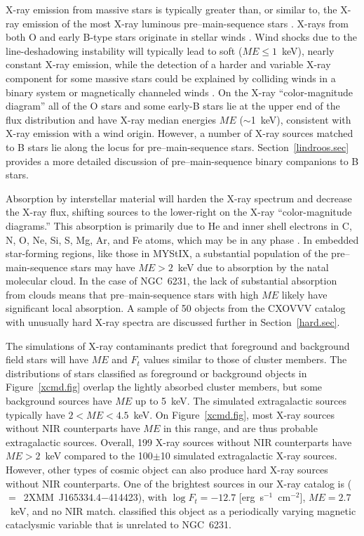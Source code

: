 \documentclass[twocolumn,tighten]{aastex61}
\begin{document}
X-ray emission from massive stars is typically greater than, or similar to, the X-ray emission of the most X-ray luminous pre--main-sequence stars \citep[e.g.,][]{2011ApJS..194....6P}. X-rays from both O and early B-type stars originate in stellar winds \citep{1980ApJ...241..300L,1988ApJ...335..914O,1999ApJ...520..833O,2008MNRAS.386.1855C}. Wind shocks due to the line-deshadowing instability will typically lead to soft ($ME\leq1$~keV), nearly constant X-ray emission, while the detection of a harder and variable X-ray component for some massive stars could be explained by colliding winds in a binary system \citep{2000ApJ...538..808Z} or magnetically channeled winds \citep{1997A&A...323..121B,2005ApJ...628..986G}.  
On the X-ray ``color-magnitude diagram'' all of the O stars and some early-B stars lie at the upper end of the flux distribution and have X-ray median energies $ME$ ($\sim$1~keV), consistent with X-ray emission with a wind origin. However, a number of X-ray sources matched to B stars lie along the locus for pre--main-sequence stars. Section~\ref{lindroos.sec} provides a more detailed discussion of pre--main-sequence binary companions to B stars.  

Absorption by interstellar material will harden the X-ray spectrum and decrease the X-ray flux, shifting sources to the lower-right on the X-ray ``color-magnitude diagrams.'' This absorption is primarily due to He and inner shell electrons in C, N, O, Ne, Si, S, Mg, Ar, and Fe atoms, which may be in any phase \citep{2000ApJ...542..914W}. In embedded star-forming regions, like those in MYStIX, a substantial population of the pre--main-sequence stars may have $ME>2$~keV due to absorption by the natal molecular cloud. In the case of NGC~6231, the lack of substantial absorption from clouds means that pre--main-sequence stars with high $ME$ likely have significant local absorption. 
A sample of 50 objects from the CXOVVV catalog with unusually hard X-ray spectra are discussed further in Section~\ref{hard.sec}.

The simulations of X-ray contaminants predict that foreground and background field stars will have $ME$ and $F_t$ values similar to those of cluster members. The distributions of stars classified as foreground or background objects in Figure~\ref{xcmd.fig} overlap the lightly absorbed cluster members, but some background sources have $ME$ up to 5~keV. The simulated extragalactic sources typically have $2<ME<4.5$~keV. On Figure~\ref{xcmd.fig}, most X-ray sources without NIR counterparts have $ME$ in this range, and are thus probable extragalactic sources. Overall, 199 X-ray sources without NIR counterparts have $ME>2$~keV compared to the 100$\pm$10 simulated extragalactic X-ray sources. However, other types of cosmic object can also produce hard X-ray sources without NIR counterparts.  One of the brightest sources in our X-ray catalog is  ($=$~2XMM~J165334.4$-$414423), with $\log F_t=-12.7$ [erg~s$^{-1}$~cm$^{-2}$], $ME=2.7$~keV, and no NIR match. \citet{2014ApJ...780...39L} classified this object as a periodically varying magnetic cataclysmic variable that is unrelated to NGC~6231. 
\end{document}
